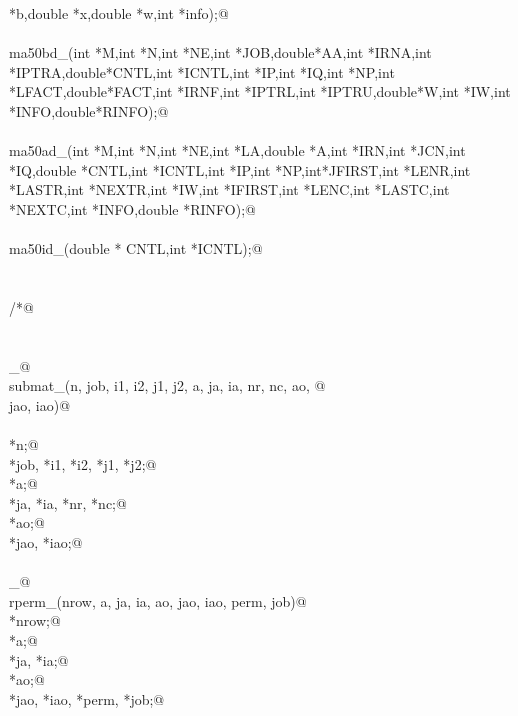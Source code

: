 \documentclass[12pt]{article}
\begin{document}
\begin{flushleft}
\begin{minipage}{\linewidth}
\begin{list}{}{}
\mbox{}\verb@double *b,double *x,double *w,int *info);@\\
\mbox{}\verb@@\\
\mbox{}\verb@void ma50bd_(int *M,int *N,int *NE,int *JOB,double*AA,int *IRNA,int *IPTRA,double*CNTL,int *ICNTL,int *IP,int *IQ,int *NP,int *LFACT,double*FACT,int *IRNF,int *IPTRL,int *IPTRU,double*W,int *IW,int *INFO,double*RINFO);@\\
\mbox{}\verb@@\\
\mbox{}\verb@void ma50ad_(int *M,int *N,int *NE,int *LA,double *A,int *IRN,int *JCN,int *IQ,double *CNTL,int *ICNTL,int *IP,int *NP,int*JFIRST,int *LENR,int *LASTR,int *NEXTR,int *IW,int *IFIRST,int *LENC,int *LASTC,int *NEXTC,int *INFO,double *RINFO);@\\
\mbox{}\verb@@\\
\mbox{}\verb@void ma50id_(double * CNTL,int *ICNTL);@\\
\mbox{}\verb@@\\
\mbox{}\verb@@\\
\mbox{}\verb@/*@\\
\mbox{}\verb@@\\
\mbox{}\verb@@\\
\mbox{}\verb@submat_@\\
\mbox{}\verb@int submat_(n, job, i1, i2, j1, j2, a, ja, ia, nr, nc, ao, @\\
\mbox{}\verb@        jao, iao)@\\
\mbox{}\verb@@\\
\mbox{}\verb@integer *n;@\\
\mbox{}\verb@integer *job, *i1, *i2, *j1, *j2;@\\
\mbox{}\verb@doublereal *a;@\\
\mbox{}\verb@integer *ja, *ia, *nr, *nc;@\\
\mbox{}\verb@doublereal *ao;@\\
\mbox{}\verb@integer *jao, *iao;@\\
\mbox{}\verb@@\\
\mbox{}\verb@rperm_@\\
\mbox{}\verb@int rperm_(nrow, a, ja, ia, ao, jao, iao, perm, job)@\\
\mbox{}\verb@integer *nrow;@\\
\mbox{}\verb@doublereal *a;@\\
\mbox{}\verb@integer *ja, *ia;@\\
\mbox{}\verb@doublereal *ao;@\\
\mbox{}\verb@integer *jao, *iao, *perm, *job;@\\

\end{list}
\end{minipage}
\end{flushleft}
\end{document}

